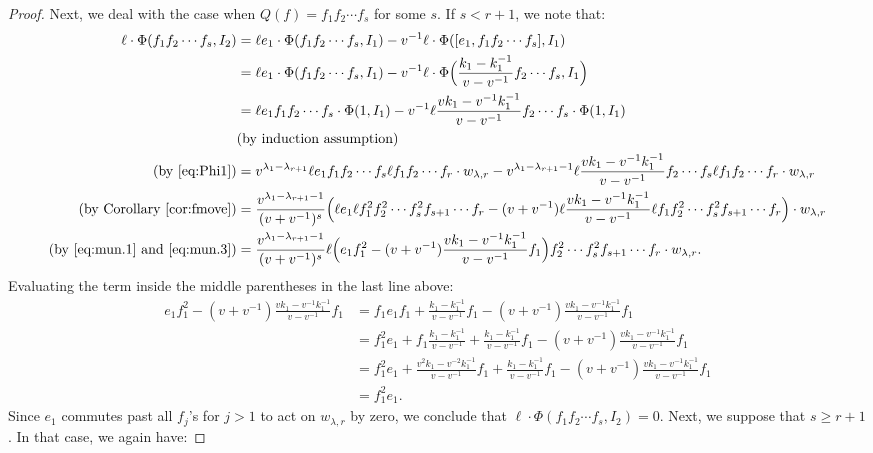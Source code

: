 \documentclass{amsart}
\numberwithin{equation}{section}
\theoremstyle{theorem}
\theoremstyle{definition}
\begin{document}
\begin{proof}
Next, we deal with the case when $Q(f)=f_1f_2\cdots f_s$ for some $s$. If $ s<r+1$, we note that:
\begin{align}
\notag\ell\cdot\Phi(f_1f_2\cdots f_s,I_{2})&=\ell e_1\cdot \Phi(f_1f_2\cdots f_s, I_1)-v^{-1}\ell\cdot \Phi([e_1,f_1f_2\cdots f_s], I_{1})\\
\notag&=\ell e_1\cdot \Phi(f_1f_2\cdots f_s, I_1)-v^{-1}\ell\cdot\Phi\Big(\frac{k_1-k_1^{-1}}{v-v^{-1}}f_2\cdots f_s, I_{1}\Big)\\
\notag&=\ell e_1f_1f_2\cdots f_s\cdot \Phi(1, I_1)-v^{-1}\ell\frac{vk_1-v^{-1}k_1^{-1}}{v-v^{-1}}f_2\cdots f_s\cdot \Phi(1, I_{1})\\
\notag&\text{(by induction assumption)}\\
\notag\text{(by~\eqref{eq:Phi1})}&=v^{\lambda_1-\lambda_{r+1}}\ell e_1f_1f_2\cdots f_s\ell f_1f_2\cdots f_r \cdot  w_{\lambda,r}-v^{\lambda_1-\lambda_{r+1}-1}\ell\frac{vk_1-v^{-1}k_1^{-1}}{v-v^{-1}}f_2\cdots f_s\ell f_1f_2\cdots f_r \cdot  w_{\lambda,r}\\
\notag\text{(by Corollary~\ref{cor:fmove})}&=\frac{v^{\lambda_1-\lambda_{r+1}-1}}{(v+v^{-1})^s}\Big(\ell e_1\ell f_1^2f_2^2\cdots f_s^2 f_{s+1}\cdots f_r -(v+v^{-1})\ell\frac{vk_1-v^{-1}k_1^{-1}}{v-v^{-1}}\ell f_1f_2^2\cdots f_s^2 f_{s+1}\cdots f_r\Big) \cdot  w_{\lambda,r}\\
\notag\text{(by~\eqref{eq:mun.1} and~\eqref{eq:mun.3})}&=\frac{v^{\lambda_1-\lambda_{r+1}-1}}{(v+v^{-1})^s}\ell\Big(e_1 f_1^2 -(v+v^{-1})\frac{vk_1-v^{-1}k_1^{-1}}{v-v^{-1}} f_1\Big)f_2^2\cdots f_s^2 f_{s+1}\cdots f_r \cdot  w_{\lambda,r}.
\end{align}
Evaluating the term inside the middle parentheses in the last line above:
\begin{align*}
 e_1 f_1^2-(v+v^{-1})\frac{vk_1-v^{-1}k_1^{-1}}{v-v^{-1}} f_1& =  f_1e_1f_1+\frac{k_1-k_1^{-1}}{v-v^{-1}}f_1-(v+v^{-1})\frac{vk_1-v^{-1}k_1^{-1}}{v-v^{-1}} f_1\\
& = f_1^2e_1+f_1\frac{k_1-k_1^{-1}}{v-v^{-1}}+ \frac{k_1-k_1^{-1}}{v-v^{-1}}f_1-(v+v^{-1})\frac{vk_1-v^{-1}k_1^{-1}}{v-v^{-1}} f_1\\
& = f_1^2e_1+\frac{v^2k_1-v^{-2}k_1^{-1}}{v-v^{-1}}f_1+\frac{k_1-k_1^{-1}}{v-v^{-1}}f_1-(v+v^{-1})\frac{vk_1-v^{-1}k_1^{-1}}{v-v^{-1}} f_1\\
& = f_1^2e_1.
\end{align*}
Since $e_1$ commutes past all $f_j$'s for $j>1$ to act on $w_{\lambda, r}$ by zero, we conclude that $\ell\cdot \Phi(f_1f_2\cdots f_s, I_2)=0$. Next, we suppose that $s\geq r+1$. In that case, we again have:

\end{proof}
\end{document}

